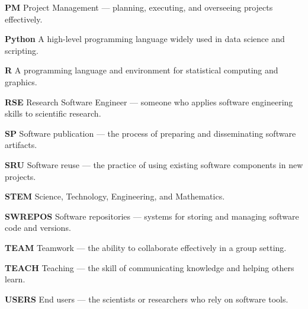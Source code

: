 \documentclass[
        english,biblatex
    ]{lni}
\begin{document}
    \textbf{PM} Project Management --- planning, executing, and
    overseeing projects effectively.

    \textbf{Python} A high-level programming language widely used in
    data science and scripting.

    \textbf{R} A programming language and environment for statistical
    computing and graphics.

    \textbf{RSE} Research Software Engineer --- someone who applies
    software engineering skills to scientific research.

    \textbf{SP} Software publication --- the process of preparing and
    disseminating software artifacts.

    \textbf{SRU} Software reuse --- the practice of using existing
    software components in new projects.

    \textbf{STEM} Science, Technology, Engineering, and Mathematics.

    \textbf{SWREPOS} Software repositories --- systems for storing and
    managing software code and versions.

    \textbf{TEAM} Teamwork --- the ability to collaborate effectively in
    a group setting.

    \textbf{TEACH} Teaching --- the skill of communicating knowledge and
    helping others learn.

    \textbf{USERS} End users --- the scientists or researchers who rely
    on software tools.

\end{document}
